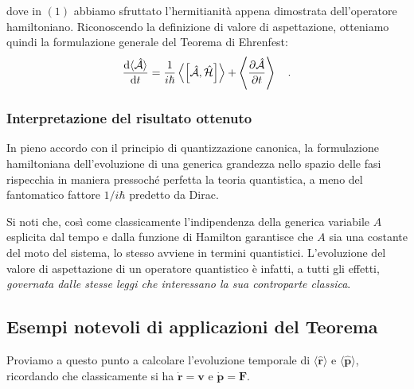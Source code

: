 dove in $(1)$ abbiamo sfruttato l'hermitianità appena dimostrata dell'operatore hamiltoniano. Riconoscendo la definizione di valore di aspettazione, otteniamo quindi la formulazione generale del Teorema di Ehrenfest:
\begin{equation}
    \dv{\langle \hat{\mathcal{A}} \rangle}{t} = \frac{1}{i\hbar}\left\langle \left[ \hat{\mathcal{A}},\hat{\mathcal{H}} \right] \right\rangle + \left\langle \pdv{\hat{\mathcal{A}}}{t}\right\rangle\quad.
    \label{eq:teo_ehrenfest}
\end{equation}

\subsubsection{Interpretazione del risultato ottenuto}
In pieno accordo con il principio di quantizzazione canonica, la formulazione hamiltoniana dell'evoluzione di una generica grandezza nello spazio delle fasi rispecchia in maniera pressoché perfetta la teoria quantistica, a meno del fantomatico fattore $1/i\hbar$ predetto da Dirac. 

Si noti che, così come classicamente l'indipendenza della generica variabile $A$ esplicita dal tempo e dalla funzione di Hamilton garantisce che $A$ sia una costante del moto del sistema, lo stesso avviene in termini quantistici. L'evoluzione del valore di aspettazione di un operatore quantistico è infatti, a tutti gli effetti, \textit{governata dalle stesse leggi che interessano la sua controparte classica}.

\subsection{Esempi notevoli di applicazioni del Teorema}
Proviamo a questo punto a calcolare l'evoluzione temporale di $\langle  \hat{\bm{r}}\rangle $ e $\langle  \hat{\bm{p}}\rangle $, ricordando che classicamente si ha $\dot{\bm{r}} = \bm{v}$ e $\dot{\bm{p}} = \bm{F}$.

